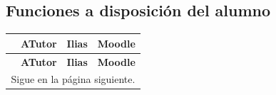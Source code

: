 \subsection{Funciones a disposición del alumno}
\begin{center}
\begin{longtable}{| p{} | p{} | p{} | p{} |}
	\hline
	  & \textbf{ATutor} & \textbf{Ilias} & \textbf{Moodle} \\
	\hline 
	\endfirsthead
	\hline
	  & \textbf{ATutor} & \textbf{Ilias} & \textbf{Moodle} \\
	\hline 
	\endhead
	
	\multicolumn{4}{c}{Sigue en la página siguiente.}
	\endfoot

	\endlastfoot
	

\end{longtable}
\end{center}

